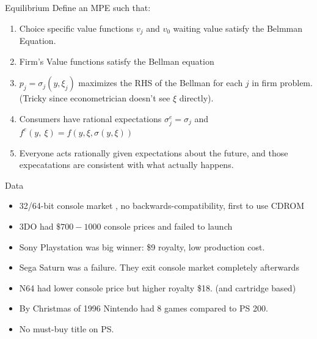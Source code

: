 \documentclass[xcolor=pdftex,dvipsnames,table,mathserif]{beamer}
\begin{document}
\begin{frame}{Equilibrium}
Define an MPE such that:
\begin{enumerate}
\item Choice specific value functions $v_j$ and $v_0$ waiting value satisfy the Belmman Equation.
\item Firm's Value functions satisfy the Bellman equation
\item $p_j = \sigma_j(y,\xi_j)$ maximizes the RHS of the Bellman for each $j$ in firm problem. (Tricky since econometrician doesn't see $\xi$ directly).
\item Consumers have rational expectations $\sigma^e_j = \sigma_j$ and $f^e(y,\
\xi) = f(y,\xi,\sigma(y,\xi))$ 
\item Everyone acts rationally given expectations about the future, and those expecatations are consistent with what actually happens.
\end{enumerate}
\end{frame}



\begin{frame}{Data}
\begin{itemize}
\item 32/64-bit console market , no backwards-compatibility, first to use CDROM
\item 3DO had $\$700-1000$ console prices and failed to launch
\item Sony Playstation was big winner: \$9 royalty, low production cost.
\item Sega Saturn was a failure. They exit console market completely afterwards
\item N64 had lower console price but higher royalty \$18. (and cartridge based)
\item By Christmas of 1996 Nintendo had 8 games compared to PS 200.
\item No must-buy title on PS.
\end{itemize}
\end{frame}
\end{document}
